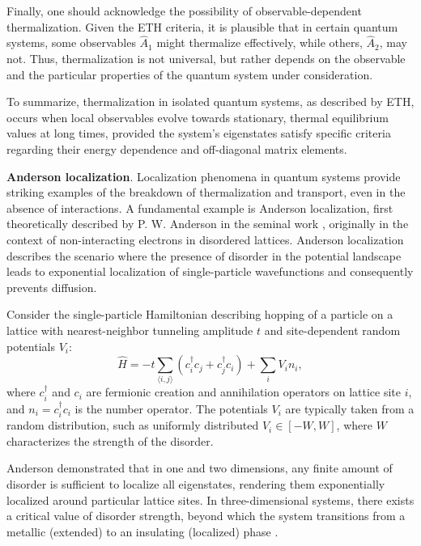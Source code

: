 Finally, one should acknowledge the possibility of observable-dependent thermalization. Given the ETH criteria, it is plausible that in certain quantum systems, some observables $\hat{A}_1$ might thermalize effectively, while others, $\hat{A}_2$, may not. Thus, thermalization is not universal, but rather depends on the observable and the particular properties of the quantum system under consideration.

To summarize, thermalization in isolated quantum systems, as described by ETH, occurs when local observables evolve towards stationary, thermal equilibrium values at long times, provided the system's eigenstates satisfy specific criteria regarding their energy dependence and off-diagonal matrix elements.


\textbf{Anderson localization}.
Localization phenomena in quantum systems provide striking examples of the breakdown of thermalization and transport, even in the absence of interactions. A fundamental example is Anderson localization, first theoretically described by P. W. Anderson in the seminal work \cite{anderson_absence_1958}, originally in the context of non-interacting electrons in disordered lattices. Anderson localization describes the scenario where the presence of disorder in the potential landscape leads to exponential localization of single-particle wavefunctions and consequently prevents diffusion.

Consider the single-particle Hamiltonian describing hopping of a particle on a lattice with nearest-neighbor tunneling amplitude $t$ and site-dependent random potentials $V_i$:
\begin{equation}
\hat{H} = -t \sum_{\langle i,j\rangle} (c_i^\dagger c_j + c_j^\dagger c_i) + \sum_{i} V_i n_i,
\label{eq:anderson_ham}
\end{equation}
where $c_i^\dagger$ and $c_i$ are fermionic creation and annihilation operators on lattice site $i$, and $n_i = c_i^\dagger c_i$ is the number operator. The potentials $V_i$ are typically taken from a random distribution, such as uniformly distributed $V_i \in [-W, W]$, where $W$ characterizes the strength of the disorder.

Anderson demonstrated that in one and two dimensions, any finite amount of disorder is sufficient to localize all eigenstates, rendering them exponentially localized around particular lattice sites. In three-dimensional systems, there exists a critical value of disorder strength, beyond which the system transitions from a metallic (extended) to an insulating (localized) phase \cite{abrahams_50_2010}.

